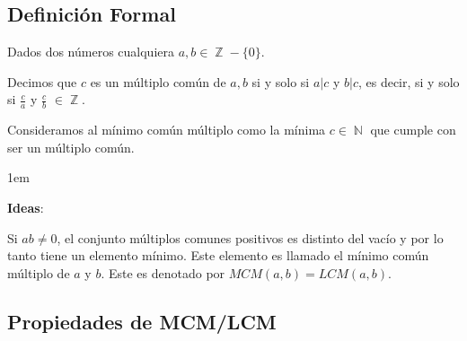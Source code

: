 \documentclass[12pt, fleqn]{report}                             %
\newenvironment{SmallIndentation}[1][0.75em]                    %
    {\begin{adjustwidth}{#1}{}\begin{footnotesize}}                 %
    {\end{footnotesize}\end{adjustwidth}}                           %
\DeclareMathOperator \Naturals  {\mathbb{N}}                     %
\DeclareMathOperator \Integers  {\mathbb{Z}}                     %
\begin{document}
        \subsection*{Definición Formal}

            Dados dos números cualquiera $a, b \in \Integers - \{0\}$.

            Decimos que $c$ es un múltiplo común de $a,b$ si y solo si $a|c$ y $b|c$, es decir,
            si y solo si $\frac{c}{a}$ y $\frac{c}{b}$ $\in \Integers$.

            Consideramos al mínimo común múltiplo como la mínima $c \in \Naturals$ que cumple
            con ser un múltiplo común.

            \begin{SmallIndentation}[1em]
                \textbf{Ideas}:

                Si $ab \neq 0$, el conjunto múltiplos comunes positivos es distinto del vacío
                y por lo tanto tiene un elemento mínimo. Este elemento es llamado el mínimo
                común múltiplo de $a$ y $b$. Este es denotado por $MCM(a,b) = LCM(a,b)$.

            \end{SmallIndentation}



        \clearpage
        \subsection{Propiedades de MCM/LCM}
\end{document}

